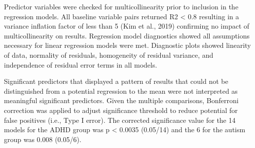 \documentclass[
  letterpaper,
]{ut-thesis}
\begin{document}
Predictor variables were checked for multicollinearity prior to
inclusion in the regression models. All baseline variable pairs returned
R2 \textless{} 0.8 resulting in a variance inflation factor of less than
5 (Kim et al., 2019) confirming no impact of multicollinearity on
results. Regression model diagnostics showed all assumptions necessary
for linear regression models were met. Diagnostic plots showed linearity
of data, normality of residuals, homogeneity of residual variance, and
independence of residual error terms in all models.

Significant predictors that displayed a pattern of results that could
not be distinguished from a potential regression to the mean were not
interpreted as meaningful significant predictors. Given the multiple
comparisons, Bonferroni correction was applied to adjust significance
threshold to reduce potential for false positives (i.e., Type I error).
The corrected significance value for the 14 models for the ADHD group
was p \textless{} 0.0035 (0.05/14) and the 6 for the autism group was
0.008 (0.05/6).
\end{document}

